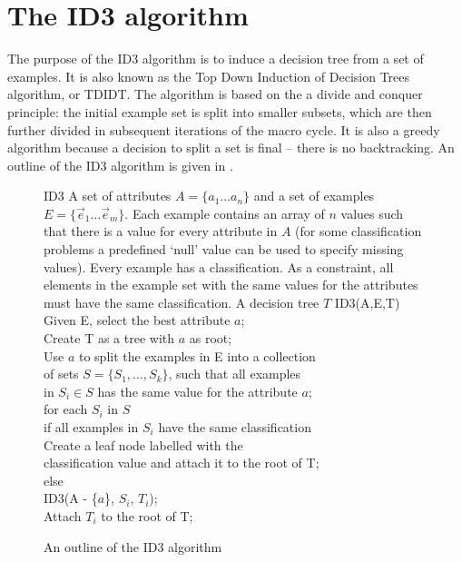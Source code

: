\section{The ID3 algorithm}
\label{sec:id3}
The purpose of the ID3 algorithm \cite{quinlan:trees} is to induce a decision tree from a set of examples.  It is also known as the Top Down Induction of Decision Trees algorithm, or TDIDT. The algorithm is based on the a divide and conquer principle: the initial example set is split into smaller subsets, which are then further divided in subsequent iterations of the macro cycle. It is also a greedy algorithm because a decision to split a set is final -- there is no backtracking.  An outline of the ID3 algorithm is given in .
\begin{figure}[!ht]
\begin{algorithm}
{ID3}
{A set of attributes $A = \{ a_1 \ldots a_n\}$ and a set of examples $E = \{\vec e_1 \ldots \vec e_m\}$.  Each example contains an array of $n$ values such that there is a value for every attribute in $A$ (for some classification problems a predefined `null' value can be used to specify missing values).  Every example has a classification. As a constraint, all elements in the example set with the same values for the attributes must have the same classification.}
{A decision tree $T$} 
ID3(A,E,T) \+\\
Given E, select the best attribute $a$; \label{line:id3_select} \\
Create T as a tree with $a$ as root; \\
Use $a$ to split the examples in E  into a collection  \+ \\
	of sets $S = \{S_1, \ldots, S_k\}$, such that all examples \\
	 in $S_i \in S$ has the same value for the attribute $a$; \- \\ 
for each $S_i$ in $S$ \+ \\
	if all examples in $S_i$ have the same classification \+ \\
			Create a leaf node labelled with the  \+ \\ 
			classification value and attach it
			to the root of T; \- \-\\ 
	else \+ \\ 
			ID3(A - \{$a$\}, $S_i$, $T_i$); \\
			Attach $T_i$ to the root of T;
\end{algorithm}
\caption{An outline of the ID3 algorithm}
\label{alg:id3}	
\end{figure}


